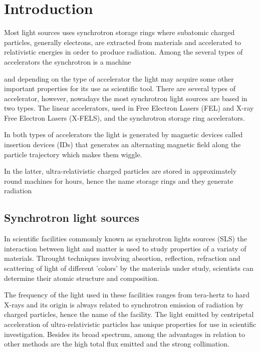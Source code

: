 \documentclass[
	12pt,				%
	openright,			%
	oneside,			%
	a4paper,		%
	chapter=TITLE,		%
	section=TITLE,		%
    brazil,				%
	english,			%
	sumario=tradicional,
	]{abntex2}
\begin{document}
	\frenchspacing

	\pretextual
	

	\textual

\chapter{Introduction} \label{chap:intro}

Most light sources uses synchrotron storage rings where subatomic charged particles, generally electrons, are extracted from materials and accelerated to relativistic energies in order to produce radiation. Among the several types of accelerators the synchrotron is a machine


and depending on the type of accelerator the light may acquire some other important properties for its use as scientific tool. There are several types of accelerator, however, nowadays the most  synchrotron light sources are based in two types. The linear accelerators, used in Free Electron Lasers (FEL) and X-ray Free Electron Lasers (X-FELS), and the synchrotron storage ring accelerators.

In both types of accelerators the light is generated by magnetic devices called insertion devices (IDs) that generates an alternating magnetic field along the particle trajectory which makes them wiggle.


In the latter, ultra-relativistic charged particles are stored in approximately round machines for hours, hence the name storage rings and they generate radiation

  \section{Synchrotron light sources}

  In scientific facilities commomly known as synchrotron lights sources (SLS) the interaction between light and matter is used to study properties of a variaty of materials. Throught techniques involving absortion, reflection, refraction and scattering of light of different 'colors' by the materials under study, scientists can determine their atomic structure and composition.

  The frequency of the light used in these facilities ranges from tera-hertz to hard X-rays and its origin is always related to synchrotron emission of radiation by charged particles, hence the name of the facility. The light emitted by centripetal acceleration of ultra-relativistic particles has unique properties for use in scientific investigation. Besides its broad spectrum, among the advantages in relation to other methods are the high total flux emitted and the strong collimation.
\end{document}

